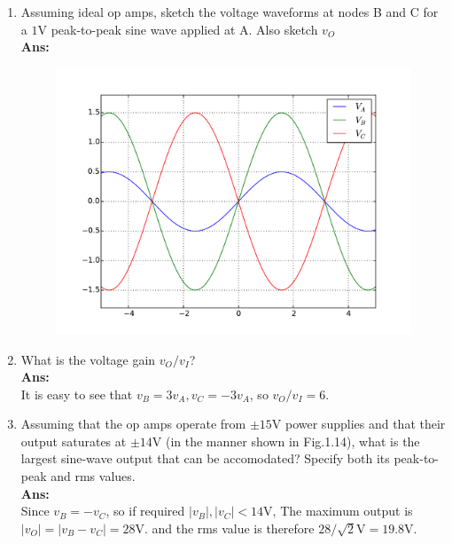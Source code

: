 \documentclass[12pt, a4paper]{article}
\newcommand{\svol}{\si{\volt}}
\newcommand{\Ans}{{\\ \bf Ans:} \\}
\begin{document}
\begin{enumerate}[label=(\alph*)]
  \item Assuming ideal op amps, sketch the voltage waveforms at nodes B and C for a $1\svol$ peak-to-peak sine wave applied at A. Also sketch $v_O$
  \Ans
  \begin{figure}[H]
    \centering
    \includegraphics[width=.6\textwidth]{2_66.pdf}
  \end{figure}
\item What is the voltage gain $v_O / v_I$?
  \Ans It is easy to see that $v_B = 3 v_A, v_C = -3 v_A$, so $v_O / v_I = 6$.
\item Assuming that the op amps operate from $\pm 15 \svol$ power supplies and that their output saturates at $\pm 14 \svol$ (in the manner shown in Fig.1.14), what is the largest sine-wave output that can be accomodated? Specify both its peak-to-peak and rms values.
  \Ans
  Since $v_B = -v_C$, so if required $|v_B|, |v_C| < 14 \svol$, The maximum output is $|v_O| = |v_B - v_C| = 28 \svol$. and the rms value is therefore $28 / \sqrt{2} \svol = 19.8 \svol$.
\end{enumerate}
\end{document}
